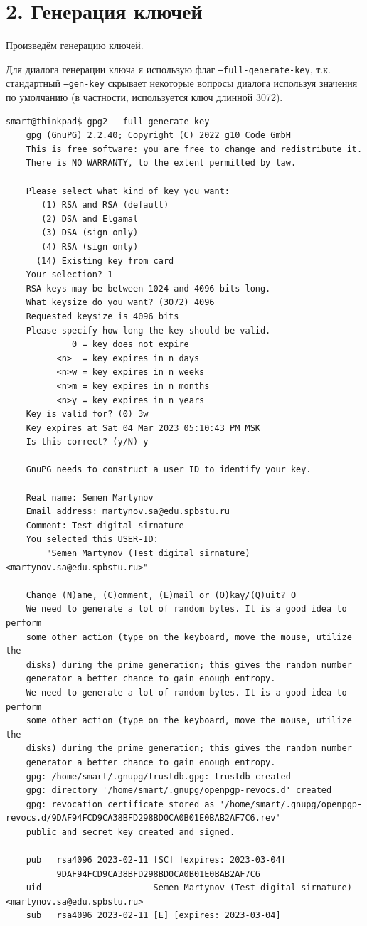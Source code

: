 \section*{2. Генерация ключей}
Произведём генерацию ключей.

Для диалога генерации ключа я использую флаг \texttt{--full-generate-key}, т.к. стандартный \texttt{--gen-key} скрывает некоторые вопросы диалога используя значения по умолчанию (в частности, используется ключ длинной 3072).
\begin{Verbatim}[frame=single,breaklines=true,breakanywhere=true]
    smart@thinkpad$ gpg2 --full-generate-key
    gpg (GnuPG) 2.2.40; Copyright (C) 2022 g10 Code GmbH
    This is free software: you are free to change and redistribute it.
    There is NO WARRANTY, to the extent permitted by law.
    
    Please select what kind of key you want:
       (1) RSA and RSA (default)
       (2) DSA and Elgamal
       (3) DSA (sign only)
       (4) RSA (sign only)
      (14) Existing key from card
    Your selection? 1
    RSA keys may be between 1024 and 4096 bits long.
    What keysize do you want? (3072) 4096
    Requested keysize is 4096 bits
    Please specify how long the key should be valid.
             0 = key does not expire
          <n>  = key expires in n days
          <n>w = key expires in n weeks
          <n>m = key expires in n months
          <n>y = key expires in n years
    Key is valid for? (0) 3w
    Key expires at Sat 04 Mar 2023 05:10:43 PM MSK
    Is this correct? (y/N) y
    
    GnuPG needs to construct a user ID to identify your key.
    
    Real name: Semen Martynov
    Email address: martynov.sa@edu.spbstu.ru
    Comment: Test digital sirnature
    You selected this USER-ID:
        "Semen Martynov (Test digital sirnature) <martynov.sa@edu.spbstu.ru>"
    
    Change (N)ame, (C)omment, (E)mail or (O)kay/(Q)uit? O
    We need to generate a lot of random bytes. It is a good idea to perform
    some other action (type on the keyboard, move the mouse, utilize the
    disks) during the prime generation; this gives the random number
    generator a better chance to gain enough entropy.
    We need to generate a lot of random bytes. It is a good idea to perform
    some other action (type on the keyboard, move the mouse, utilize the
    disks) during the prime generation; this gives the random number
    generator a better chance to gain enough entropy.
    gpg: /home/smart/.gnupg/trustdb.gpg: trustdb created
    gpg: directory '/home/smart/.gnupg/openpgp-revocs.d' created
    gpg: revocation certificate stored as '/home/smart/.gnupg/openpgp-revocs.d/9DAF94FCD9CA38BFD298BD0CA0B01E0BAB2AF7C6.rev'
    public and secret key created and signed.
    
    pub   rsa4096 2023-02-11 [SC] [expires: 2023-03-04]
          9DAF94FCD9CA38BFD298BD0CA0B01E0BAB2AF7C6
    uid                      Semen Martynov (Test digital sirnature) <martynov.sa@edu.spbstu.ru>
    sub   rsa4096 2023-02-11 [E] [expires: 2023-03-04]
\end{Verbatim}

